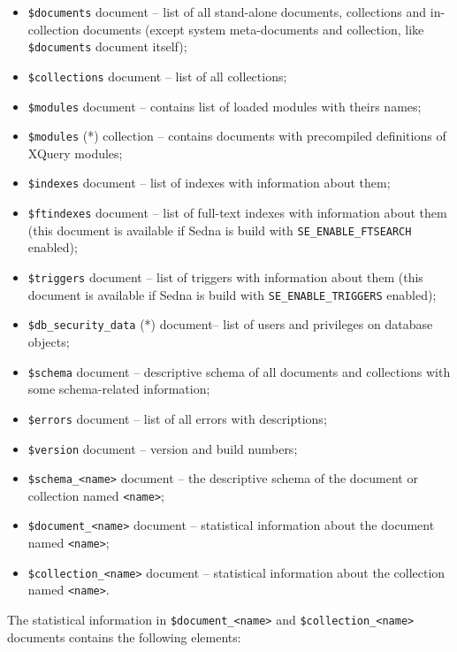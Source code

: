 \documentclass[a4paper,12pt]{article}
\newenvironment{citemize}
{\begin{itemize}
  \setlength{\itemsep}{0pt}
  \setlength{\parskip}{0pt}
  \setlength{\parsep}{0pt}}
{\end{itemize}}
\begin{document}
\begin{citemize}
\item\verb!$documents! document -- list of all stand-alone documents,
collections and in-collection documents (except system meta-documents and
collection, like \verb!$documents! document itself);
\item\verb!$collections! document -- list of all collections;
\item\verb!$modules! document -- contains list of loaded modules with
theirs names;
\item\verb!$modules! (*) collection -- contains documents with precompiled
definitions of XQuery modules;
\item\verb!$indexes! document -- list of indexes with information about
them;
\item\verb!$ftindexes! document -- list of full-text indexes with
information about them (this document is available if Sedna is build with
\verb!SE_ENABLE_FTSEARCH! enabled);
\item\verb!$triggers! document -- list of triggers with information about
them (this document is available if Sedna is build with
\verb!SE_ENABLE_TRIGGERS! enabled);
\item\verb!$db_security_data! (*) document-- list of users and privileges on
database objects;
\item\verb!$schema! document -- descriptive schema of all documents and
collections with some schema-related information;
\item\verb!$errors! document -- list of all errors with descriptions;
\item\verb!$version! document -- version and build numbers;
\item\verb!$schema_<name>! document -- the descriptive schema of the
document or collection named \verb!<name>!;
\item\verb!$document_<name>! document -- statistical information about the
document named \verb!<name>!;
\item\verb!$collection_<name>! document -- statistical information about the
collection named \verb!<name>!.
\end{citemize}

The statistical information in \verb!$document_<name>! and
\verb!$collection_<name>! documents contains the following elements:
\end{document}
